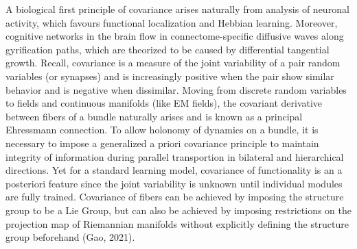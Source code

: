 \documentclass{article}
\begin{document}
   A biological first principle of covariance arises naturally from analysis of neuronal activity, which favours functional localization and Hebbian learning.
    Moreover, cognitive networks in the brain flow in connectome-specific diffusive waves along gyrification paths, which are theorized to be caused by differential tangential growth. 
    Recall, covariance is a measure of the joint variability of a pair random variables (or synapses) and is increasingly positive when the pair show similar behavior and is negative when dissimilar.
    Moving from discrete random variables to fields and continuous manifolds (like EM fields), the covariant derivative between fibers of a bundle naturally arises and is known as a principal Ehressmann connection. To allow holonomy of dynamics on a bundle, it is necessary to impose a generalized a priori covariance principle to maintain integrity of information during parallel transportion in bilateral and hierarchical directions.
    Yet for a standard learning model, covariance of functionality is an a posteriori feature since the joint variability is unknown until individual modules are fully trained. 
    Covariance of fibers can be achieved by imposing the structure group to be a Lie Group, but can also be achieved by imposing restrictions on the projection map of Riemannian manifolds without explicitly defining the structure group beforehand (Gao, 2021).
    
    

    
    
\end{document}

